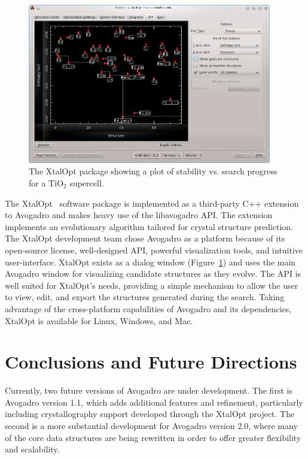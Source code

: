 \documentclass[10pt]{bmc_article}
\newenvironment{bmcformat}{\begin{raggedright}
\baselineskip20pt\sloppy\setboolean{publ}{false}}{\end{raggedright}
\baselineskip20pt\sloppy}
\begin{document}
\begin{bmcformat}
\begin{figure}
  \includegraphics[width=0.95\textwidth]{images/xtalopt}
  \caption{The XtalOpt package showing a plot of stability vs. search progress
    for a $\mathrm{TiO_2}$ supercell.}
  \label{f:xtalopt}
\end{figure}

The XtalOpt~\cite{xo1, xo2} software package is implemented as a third-party C++
extension to Avogadro and makes heavy use of the libavogadro API. The extension
implements an evolutionary algorithm tailored for crystal structure prediction.
The XtalOpt development team chose Avogadro as a platform because of its
open-source license, well-designed API, powerful visualization tools, and
intuitive user-interface. XtalOpt exists as a dialog window
(Figure~\ref{f:xtalopt}) and uses the main Avogadro window for visualizing
candidate structures as they evolve. The API is well suited for XtalOpt’s needs,
providing a simple mechanism to allow the user to view, edit, and export the
structures generated during the search. Taking advantage of the cross-platform
capabilities of Avogadro and its dependencies, XtalOpt is available for Linux,
Windows, and Mac.

\section{Conclusions and Future Directions}

Currently, two future versions of Avogadro are under development. The
first is Avogadro version 1.1, which adds additional features and
refinement, particularly including crystallography support developed
through the XtalOpt project. The second is a more substantial
development for Avogadro version 2.0, where many of the core data
structures are being rewritten in order to offer greater flexibility and
scalability.


\end{bmcformat}
\end{document}
